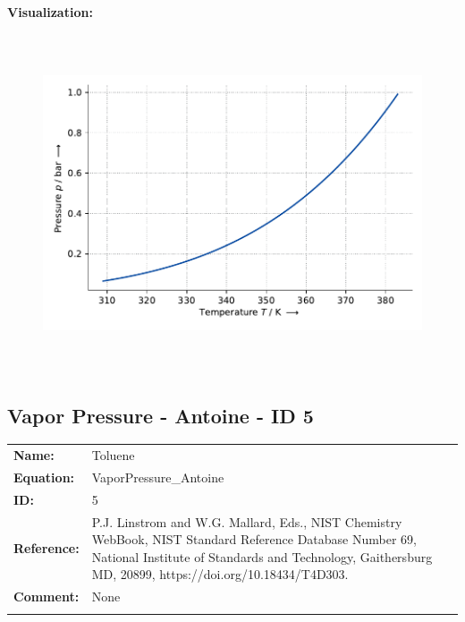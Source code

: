 \textbf{Visualization:}
%
\begin{figure}[!htp]
{\noindent\includegraphics[height=10cm, keepaspectratio]{figs/ref/ref_Toluene_VaporPressure_Antoine_4.pdf}}
\end{figure}
%

\FloatBarrier
\newpage
\subsection{Vapor Pressure - Antoine - ID 5}
%
\begin{tabular}[l]{|lp{11.5cm}|}
\hline
\addlinespace

\textbf{Name:} & Toluene \\
\textbf{Equation:} & VaporPressure\_Antoine \\
\textbf{ID:} & 5 \\
\textbf{Reference:} & P.J. Linstrom and W.G. Mallard, Eds., NIST Chemistry WebBook, NIST Standard Reference Database Number 69, National Institute of Standards and Technology, Gaithersburg MD, 20899, https://doi.org/10.18434/T4D303. \\
\textbf{Comment:} & None \\

\addlinespace
\hline
\end{tabular}
\newline

